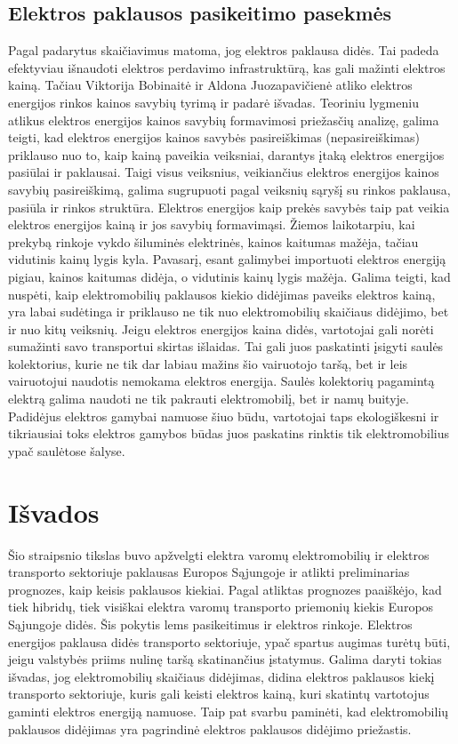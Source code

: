 \documentclass[12pt, titlepage]{article}
\newcommand{\sectionnonum}[1]{%
    \section*{#1}%
    \addcontentsline{toc}{section}{#1}%
}
\begin{document}
\subsection{Elektros paklausos pasikeitimo pasekmės}
Pagal padarytus skaičiavimus matoma, jog elektros paklausa didės. Tai padeda efektyviau išnaudoti elektros perdavimo infrastruktūrą, kas gali mažinti elektros kainą. Tačiau Viktorija Bobinaitė ir Aldona Juozapavičienė atliko elektros energijos rinkos kainos savybių tyrimą ir padarė išvadas. Teoriniu lygmeniu atlikus elektros energijos kainos
savybių formavimosi priežasčių analizę, galima teigti, kad
elektros energijos kainos savybės pasireiškimas (nepasireiškimas) priklauso nuo to, kaip kainą paveikia veiksniai,
darantys įtaką elektros energijos pasiūlai ir paklausai. Taigi
visus veiksnius, veikiančius elektros energijos kainos savybių pasireiškimą, galima sugrupuoti pagal veiksnių sąryšį su
rinkos paklausa, pasiūla ir rinkos struktūra. Elektros energijos kaip prekės savybės taip pat veikia elektros energijos
kainą ir jos savybių formavimąsi.
Žiemos laikotarpiu, kai prekybą rinkoje vykdo šiluminės
elektrinės, kainos kaitumas mažėja, tačiau vidutinis kainų
lygis kyla. Pavasarį, esant galimybei importuoti elektros
energiją pigiau, kainos kaitumas didėja, o vidutinis kainų
lygis mažėja.\parencite{juozapavivciene2012analysis}
Galima teigti, kad nuspėti, kaip elektromobilių paklausos kiekio didėjimas paveiks elektros kainą, yra labai sudėtinga ir priklauso ne tik nuo elektromobilių skaičiaus didėjimo, bet ir nuo kitų veiksnių. 
Jeigu elektros energijos kaina didės, vartotojai gali norėti sumažinti savo transportui skirtas išlaidas. Tai gali juos paskatinti įsigyti saulės kolektorius, kurie ne tik dar labiau mažins šio vairuotojo taršą, bet ir leis vairuotojui naudotis nemokama elektros energija. Saulės kolektorių pagamintą elektrą galima naudoti ne tik pakrauti elektromobilį, bet ir namų buityje. Padidėjus elektros gamybai namuose šiuo būdu, vartotojai taps ekologiškesni ir tikriausiai toks elektros gamybos būdas juos paskatins rinktis tik elektromobilius ypač saulėtose šalyse.

\newpage
\sectionnonum{Išvados}
Šio straipsnio tikslas buvo apžvelgti elektra varomų elektromobilių ir elektros transporto sektoriuje paklausas Europos Sąjungoje ir atlikti preliminarias prognozes, kaip keisis paklausos kiekiai. Pagal atliktas prognozes paaiškėjo, kad tiek hibridų, tiek visiškai elektra varomų transporto priemonių kiekis Europos Sąjungoje didės. Šis pokytis lems pasikeitimus ir elektros rinkoje. Elektros energijos paklausa didės transporto sektoriuje, ypač spartus augimas turėtų būti, jeigu valstybės priims nulinę taršą skatinančius įstatymus. Galima daryti tokias išvadas, jog elektromobilių skaičiaus didėjimas, didina elektros paklausos kiekį transporto sektoriuje, kuris gali keisti elektros kainą, kuri skatintų vartotojus gaminti elektros energiją namuose. Taip pat svarbu paminėti, kad elektromobilių paklausos didėjimas yra pagrindinė elektros paklausos didėjimo priežastis.

\newpage
\printbibliography[heading=bibintoc, title=Literatūros sąrašas]
\end{document}
